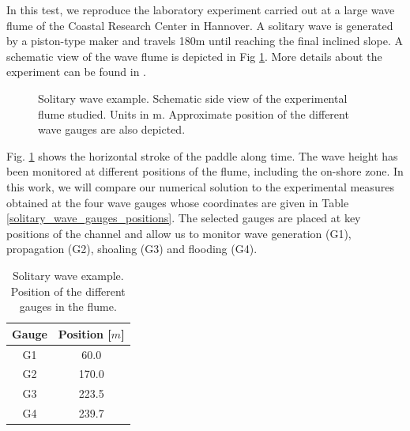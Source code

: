 In this test, we reproduce the laboratory experiment carried out at a large wave flume of the Coastal Research Center in Hannover. A solitary wave is generated by a piston-type maker and travels 180m until reaching the final inclined slope. A schematic view of the wave flume is depicted in Fig \ref{solitary_wave_channel}. More details about the experiment can be found in \cite{krautwald2020,krautwald2022,krautwald2021}.

\begin{figure} [htb]
    \centering
    \caption{Solitary wave example. Schematic side view of the experimental flume studied. Units in m. Approximate position of the different wave gauges are also depicted.}
    \label{solitary_wave_channel}
\end{figure}

Fig. \ref{piston_stroke} shows the horizontal stroke of the paddle along time. The wave height has been monitored at different positions of the flume, including the on-shore zone. In this work, we will compare our numerical solution to the experimental measures obtained at the four wave gauges whose coordinates are given in Table \ref{solitary_wave_gauges_positions}. The selected gauges are placed at key positions of the channel and allow us to monitor wave generation (G1), propagation (G2), shoaling (G3) and flooding (G4).


\begin{table} [htb]
    \begin{minipage}[b]{.48\textwidth}
    \centering
    \begin{tabular}{cc}
        \hline
        Gauge & Position [$m$] \\ \hline
        G1    &  60.0 \\
        G2    & 170.0 \\
        G3    & 223.5 \\
        G4    & 239.7 \\ \hline
    \end{tabular} \vspace*{20pt}
    \caption{Solitary wave example. Position of the different gauges in the flume.\\}
    \label{solitary_wave_gauges_positions}
    \end{minipage}
    \hfill
    \begin{minipage}[b]{.48\textwidth}
    \centering
    \label{piston_stroke}
    \end{minipage}
\end{table}

